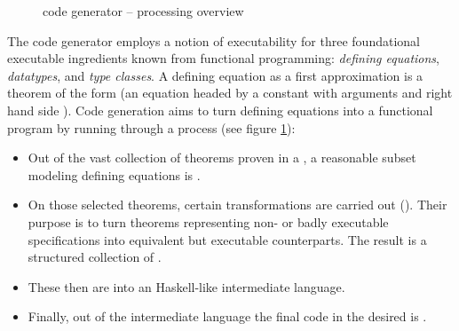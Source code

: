 \begin{isabellebody}
\begin{isamarkuptext}
\begin{figure}[h]
  \caption{code generator -- processing overview}
  \label{fig:process}
  \end{figure}

  The code generator employs a notion of executability
  for three foundational executable ingredients known
  from functional programming:
  \emph{defining equations}, \emph{datatypes}, and
  \emph{type classes}. A defining equation as a first approximation
  is a theorem of the form 
  (an equation headed by a constant  with arguments
   and right hand side ).
  Code generation aims to turn defining equations
  into a functional program by running through
  a process (see figure \ref{fig:process}):

  \begin{itemize}

    \item Out of the vast collection of theorems proven in a
      , a reasonable subset modeling
      defining equations is .

    \item On those selected theorems, certain
      transformations are carried out
      ().  Their purpose is to turn theorems
      representing non- or badly executable
      specifications into equivalent but executable counterparts.
      The result is a structured collection of .

    \item These  then are 
      into an Haskell-like intermediate
      language.

    \item Finally, out of the intermediate language the final
      code in the desired  is .

  \end{itemize}


\end{isamarkuptext}
\end{isabellebody}
